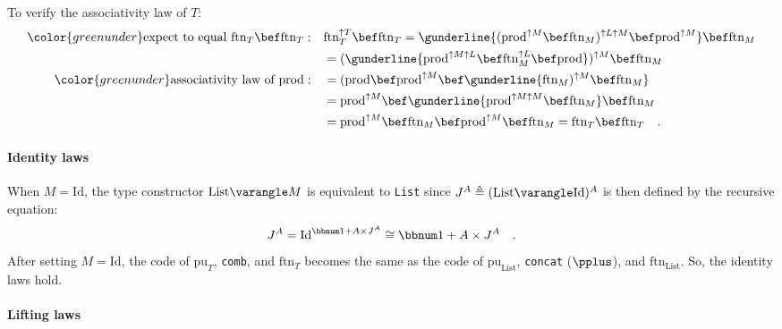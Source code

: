 To verify the associativity law of $T$:
\begin{align*}
{\color{greenunder}\text{expect to equal }\text{ftn}_{T}\bef\text{ftn}_{T}:}\quad & \text{ftn}_{T}^{\uparrow T}\bef\text{ftn}_{T}=\gunderline{(\text{prod}^{\uparrow M}\bef\text{ftn}_{M})^{\uparrow L\uparrow M}\bef\text{prod}^{\uparrow M}}\bef\text{ftn}_{M}\\
 & =(\gunderline{\text{prod}^{\uparrow M\uparrow L}\bef\text{ftn}_{M}^{\uparrow L}\bef\text{prod}})^{\uparrow M}\bef\text{ftn}_{M}\\
{\color{greenunder}\text{associativity law of }\text{prod}:}\quad & =(\text{prod}\bef\text{prod}^{\uparrow M}\bef\gunderline{\text{ftn}_{M})^{\uparrow M}\bef\text{ftn}_{M}}\\
 & =\text{prod}^{\uparrow M}\bef\gunderline{\text{prod}^{\uparrow M\uparrow M}\bef\text{ftn}_{M}}\bef\text{ftn}_{M}\\
 & =\text{prod}^{\uparrow M}\bef\text{ftn}_{M}\bef\text{prod}^{\uparrow M}\bef\text{ftn}_{M}=\text{ftn}_{T}\bef\text{ftn}_{T}\quad.
\end{align*}


\paragraph{Identity laws}

When $M=\text{Id}$, the type constructor $\text{List}\varangle M$
is equivalent to \lstinline!List! since $J^{A}\triangleq(\text{List}\varangle\text{Id})^{A}$
is then defined by the recursive equation:
\[
J^{A}=\text{Id}^{\bbnum 1+A\times J^{A}}\cong\bbnum 1+A\times J^{A}\quad.
\]
After setting $M=\text{Id}$, the code of $\text{pu}_{T}$, \lstinline!comb!,
and $\text{ftn}_{T}$ becomes the same as the code of $\text{pu}_{\text{List}}$,
\lstinline!concat! ($\pplus$), and $\text{ftn}_{\text{List}}$.
So, the identity laws hold.

\paragraph{Lifting laws}

